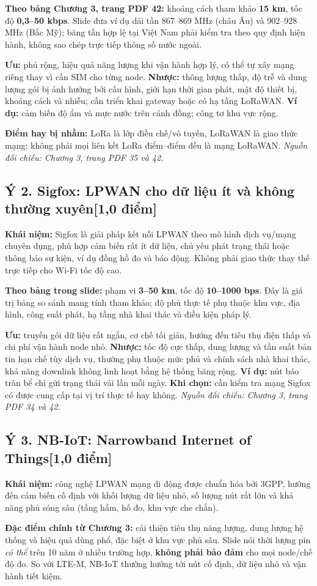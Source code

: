 \documentclass[12pt,a4paper]{article}
\newcommand{\muc}[1]{\subsection*{#1\hfill{\color{teal}\normalsize [1,0 điểm]}}}
\newcommand{\nguon}[1]{{\small\itshape\color{navy}Nguồn đối chiếu: #1.}}
\begin{document}
\textbf{Theo bảng Chương 3, trang PDF 42:} khoảng cách tham khảo \textbf{15 km}, tốc độ \textbf{0,3--50 kbps}. Slide đưa ví dụ dải tần 867--869 MHz (châu Âu) và 902--928 MHz (Bắc Mỹ); băng tần hợp lệ tại Việt Nam phải kiểm tra theo quy định hiện hành, không sao chép trực tiếp thông số nước ngoài.

\textbf{Ưu:} phủ rộng, hiệu quả năng lượng khi vận hành hợp lý, có thể tự xây mạng riêng thay vì cần SIM cho từng node. \textbf{Nhược:} thông lượng thấp, độ trễ và dung lượng gói bị ảnh hưởng bởi cấu hình, giới hạn thời gian phát, mật độ thiết bị, khoảng cách và nhiễu; cần triển khai gateway hoặc có hạ tầng LoRaWAN. \textbf{Ví dụ:} cảm biến độ ẩm và mực nước trên cánh đồng; công tơ khu vực rộng.

\textbf{Điểm hay bị nhầm:} LoRa là lớp điều chế/vô tuyến, LoRaWAN là giao thức mạng; không phải mọi liên kết LoRa điểm--điểm đều là mạng LoRaWAN. \nguon{Chương 3, trang PDF 35 và 42}

\muc{Ý 2. Sigfox: LPWAN cho dữ liệu ít và không thường xuyên}
\textbf{Khái niệm:} Sigfox là giải pháp kết nối LPWAN theo mô hình dịch vụ/mạng chuyên dụng, phù hợp cảm biến rất ít dữ liệu, chủ yếu phát trạng thái hoặc thông báo sự kiện, ví dụ đồng hồ đo và báo động. Không phải giao thức thay thế trực tiếp cho Wi-Fi tốc độ cao.

\textbf{Theo bảng trong slide:} phạm vi \textbf{3--50 km}, tốc độ \textbf{10--1000 bps}. Đây là giá trị bảng so sánh mang tính tham khảo; độ phủ thực tế phụ thuộc khu vực, địa hình, công suất phát, hạ tầng nhà khai thác và điều kiện pháp lý.

\textbf{Ưu:} truyền gói dữ liệu rất ngắn, cơ chế tối giản, hướng đến tiêu thụ điện thấp và chi phí vận hành node nhỏ. \textbf{Nhược:} tốc độ cực thấp, dung lượng và tần suất bản tin hạn chế tùy dịch vụ, thường phụ thuộc mức phủ và chính sách nhà khai thác, khả năng downlink không linh hoạt bằng hệ thống băng rộng. \textbf{Ví dụ:} nút báo tràn bể chỉ gửi trạng thái vài lần mỗi ngày. \textbf{Khi chọn:} cần kiểm tra mạng Sigfox có được cung cấp tại vị trí thực tế hay không. \nguon{Chương 3, trang PDF 34 và 42}

\muc{Ý 3. NB-IoT: Narrowband Internet of Things}
\textbf{Khái niệm:} công nghệ LPWAN mạng di động được chuẩn hóa bởi 3GPP, hướng đến cảm biến cố định với khối lượng dữ liệu nhỏ, số lượng nút rất lớn và khả năng phủ sóng sâu (tầng hầm, hố đo, khu vực che chắn).

\textbf{Đặc điểm chính từ Chương 3:} cải thiện tiêu thụ năng lượng, dung lượng hệ thống và hiệu quả dùng phổ, đặc biệt ở khu vực phủ sâu. Slide nói thời lượng pin \emph{có thể} trên 10 năm ở nhiều trường hợp, \textbf{không phải bảo đảm} cho mọi node/chế độ đo. So với LTE-M, NB-IoT thường hướng tới nút cố định, dữ liệu nhỏ và vận hành tiết kiệm.
\end{document}
